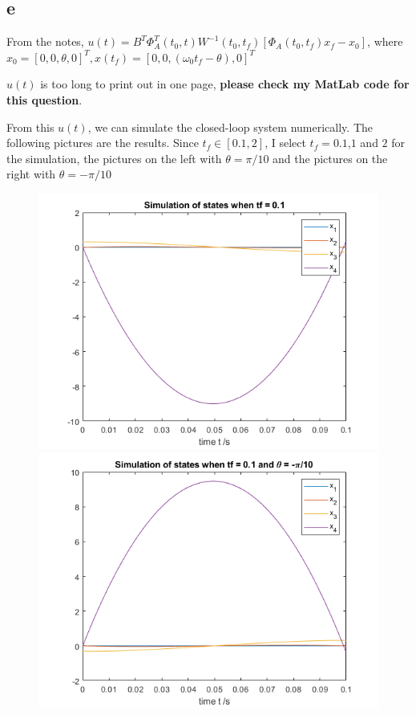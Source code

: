 \documentclass{article}
\begin{document}
\subsection{e}
From the notes, $u(t) = B^T \Phi_A^T(t_0, t) W^{-1}(t_0, t_f) [\Phi_A(t_0, t_f) x_f - x_0]$, where $x_0 = [0,0,\theta,0]^T, x(t_f) = [0,0,(\omega_0 t_f - \theta),0]^T$

$u(t)$ is too long to print out in one page, \textbf{please check my MatLab code for this question}.

From this $u(t)$, we can simulate the closed-loop system numerically. The following pictures are the results. Since $t_f \in [0.1, 2]$,  I select $t_f = 0.1$,$1$ and $2$ for the simulation, the pictures on the left with $\theta = \pi/10$ and the pictures on the right with $\theta = -\pi/10$

\begin{figure}[H]
\includegraphics[width=0.5\linewidth]{simulation_tf_01.png}
\includegraphics[width=0.5\linewidth]{simulation_tf_01_m.png}
\end{figure}
\end{document}
